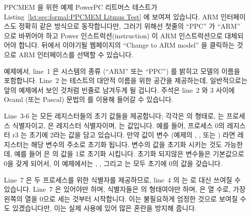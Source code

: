PPCMEM 을 위한 예제 PowerPC 리트머스 테스트가
Listing~\ref{lst:sec:formal:PPCMEM Litmus Test}
에 보여져 있습니다.
ARM 인터페이스도 정확히 같은 방식으로 동작합니다만, 그러기 위해선 첫줄의
``PPC'' 가 ``ARM'' 으로 바뀌어야 하고 Power 인스트럭션(instruction) 이 ARM
인스트럭션으로 대체되어야 합니다.
뒤에서 이야기될 웹페이지의 ``Change to ARM model'' 을 클릭하는 것으로 ARM
인터페이스를 선택할 수 있습니다.

예제에서, line~1 은 시스템의 종류 (``ARM'' 또는 ``PPC'') 를 밝히고 모델의
이름을 포함합니다.
Line~2 는 테스트의 대안적 이름을 위한 공간을 제공하는데, 일반적으로는 앞의
예제에서 보인 것처럼 빈줄로 남겨두게 될 겁니다.
주석은 line~2 와 3 사이에 Ocaml (또는 Pascal) 문법의 \nbco{(* *)} 를 이용해
들어갈 수 있습니다.
\iffalse

An example PowerPC litmus test for PPCMEM is shown in
Listing~\ref{lst:sec:formal:PPCMEM Litmus Test}.
The ARM interface works exactly the same way, but with ARM instructions
substituted for the Power instructions and with the initial ``PPC''
replaced by ``ARM''. You can select the ARM interface by clicking on
``Change to ARM Model'' at the web page called out above.

In the example, line~1 identifies the type of system (``ARM'' or ``PPC'')
and contains the title for the model. Line~2 provides a place for an
alternative name for the test, which you will usually want to leave
blank as shown in the above example. Comments can be inserted between
lines~2 and~3 using the OCaml (or Pascal) syntax of \nbco{(* *)}.
\fi

Line~3-6 는 모든 레지스터들의 초기 값들을 제공합니다; 각각은  의
형태로,  는 프로세스 식별자이고,  은 레지스터 식별자이며,  는
값입니다.
예를 들어, 프로세스 0의 레지스터 r3 는 초기에 2라는 값을 담고 있습니다.
만약 값이 변수 (예제의 , , 또는 ) 라면 레지스터는 해당 변수의
주소로 초기화 됩니다.
변수의 값을 초기화 시키는 것도 가능한데, 예를 들어  은  의 값을
1로 초기화 시킵니다.
초기화 되지않은 변수들은 기본값으로 0을 갖게 되어서, 이 예제에서는 ,
, 그리고  는 모두 초기에 0의 값을 갖습니다.

Line~7 은 두 프로세스를 위한 식별자를 제공하므로, line~4 의  는
 로 대신 쓰여질 수 있습니다.
Line~7 은 있어야만 하며, 식별자들은  의 형태여야만 하며,  은 열
수로, 가장 왼쪽의 열을 0으로 세는 것부터 시작합니다.
이는 불필요하게 엄정한 것으로 보여질 수도 있겠습니다만, 이는 실제 사용에 있어
많은 혼란을 방지해 줍니다.
\iffalse

